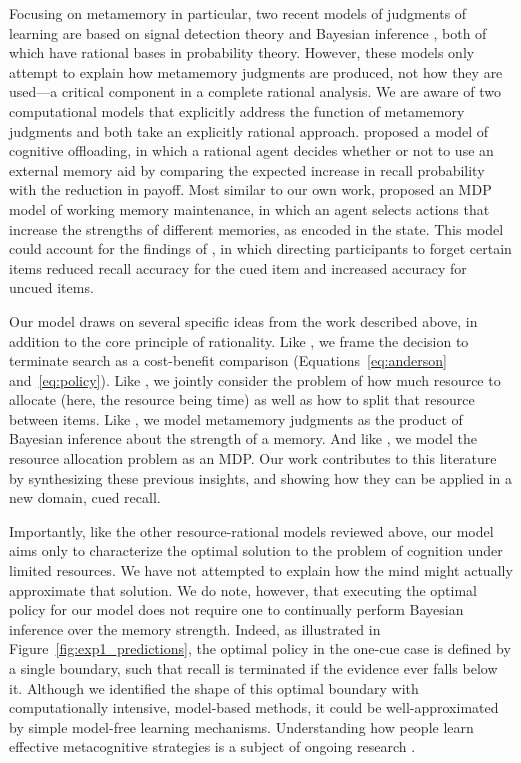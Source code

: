 Focusing on metamemory in particular, two recent models of judgments of learning are based on signal detection theory \citep{jang2012stochastic} and Bayesian inference \citep{hu2021bayesian}, both of which have rational bases in probability theory. However, these models only attempt to explain how metamemory judgments are produced, not how they are used---a critical component in a complete rational analysis. We are aware of two computational models that explicitly address the function of metamemory judgments and both take an explicitly rational approach. \citet{hu2019role} proposed a model of cognitive offloading, in which a rational agent decides whether or not to use an external memory aid by comparing the expected increase in recall probability with the reduction in payoff. Most similar to our own work, \citet{suchow2016deciding} proposed an MDP model of working memory maintenance, in which an agent selects actions that increase the strengths of different memories, as encoded in the state. This model could account for the findings of \citet{williams2013benefit}, in which directing participants to forget certain items reduced recall accuracy for the cued item and increased accuracy for uncued items.

Our model draws on several specific ideas from the work described above, in addition to the core principle of rationality. Like \citet{anderson1989human}, we frame the decision to terminate search as a cost-benefit comparison (Equations~\ref{eq:anderson} and~\ref{eq:policy}). Like \citet{vandenberg2018resourcerational}, we jointly consider the problem of how much resource to allocate (here, the resource being time) as well as how to split that resource between items. Like \citet{hu2021bayesian}, we model metamemory judgments as the product of Bayesian inference about the strength of a memory. And like \citet{suchow2016deciding}, we model the resource allocation problem as an MDP. Our work contributes to this literature by synthesizing these previous insights, and showing how they can be applied in a new domain, cued recall.

Importantly, like the other resource-rational models reviewed above, our model aims only to characterize the optimal solution to the problem of cognition under limited resources. We have not attempted to explain how the mind might actually approximate that solution. We do note, however, that executing the optimal policy for our model does not require one to continually perform Bayesian inference over the memory strength. Indeed, as illustrated in Figure~\ref{fig:exp1_predictions}, the optimal policy in the one-cue case is defined by a single boundary, such that recall is terminated if the evidence ever falls below it. Although we identified the shape of this optimal boundary with computationally intensive, model-based methods, it could be well-approximated by simple model-free learning mechanisms. Understanding how people learn effective metacognitive strategies is a subject of ongoing research \citep{lieder2018rational,jain2019how,callaway2022leveraging,binz2022heuristics,he2022where}.

